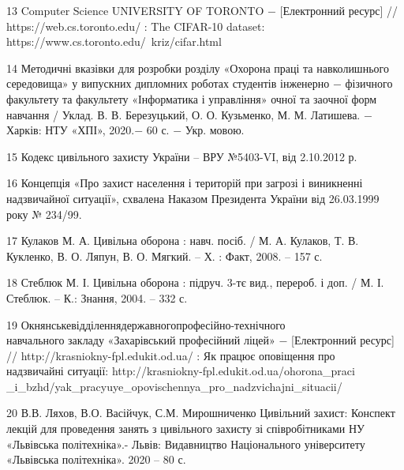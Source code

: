 13 Computer Science UNIVERSITY OF TORONTO $-$ [Електронний ресурс] // https://web.cs.toronto.edu/ : The CIFAR-10 dataset: https://www.cs.toronto.edu/~kriz/cifar.html 

14 Методичні вказівки для розробки розділу «Охорона праці та навколишнього середовища» у випускних дипломних роботах студентів інженерно $-$ фізичного факультету та факультету «Інформатика і управління» очної та заочної форм навчання / Уклад. В. В. Березуцький, О. О. Кузьменко, М. М. Латишева. $-$ Харків: НТУ «ХПІ», 2020.$-$ 60 с. $-$ Укр. мовою.

15 Кодекс цивільного захисту України – ВРУ №5403-VI, від 2.10.2012 р.

16 Концепція «Про захист населення і територій при загрозі і виникненні надзвичайної ситуації», схвалена Наказом Президента України від 26.03.1999 року № 234/99.

17 Кулаков М. А. Цивільна оборона : навч. посіб. / М. А. Кулаков, Т. В. Кукленко, В. О. Ляпун, В. О. Мягкий. – Х. : Факт, 2008. – 157 с.

18 Стеблюк М. І. Цивільна оборона  : підруч. 3-тє вид., перероб. і доп. / М. І. Стеблюк. – К.: Знання, 2004. – 332 с.

19 Окнянське\hfill відділення\hfill державного\hfill професійно-технічного\\ навчального закладу «Захарівський професійний ліцей» $-$ [Електронний ресурс] // http://krasniokny-fpl.edukit.od.ua/ : Як працює оповіщення про\\ надзвичайні ситуації: http://krasniokny-fpl.edukit.od.ua/ohorona\_praci\\\_i\_bzhd/yak\_pracyuye\_opovischennya\_pro\_nadzvichajni\_situacii/

20 В.В. Ляхов, В.О. Васійчук, С.М. Мирошниченко Цивільний захист: Конспект лекцій для проведення занять з цивільного захисту зі співробітниками НУ «Львівська політехніка».- Львів: Видавництво Національного університету «Львівська політехніка». 2020 – 80 с.
